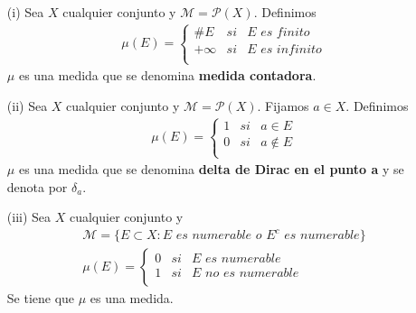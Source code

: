 \begin{ejemplo}
    \begin{enumerate}
        \item[(i)] Sea $X$ cualquier conjunto y $\mathcal{M} = \mathcal{P}(X)$. Definimos
              \begin{align*}
                  \mu(E) =  \left\{ \begin{array}{lcc}
                                        \#E     & si & \textit{E es finito}   \\
                                        +\infty & si & \textit{E es infinito} \\
                                    \end{array}
                  \right.
              \end{align*}
              $\mu$ es una medida que se denomina \textbf{medida contadora}.
        \item[(ii)] Sea $X$ cualquier conjunto y $\mathcal{M} = \mathcal{P}(X)$. Fijamos $a \in X$. Definimos
              \begin{align*}
                  \mu(E) =  \left\{ \begin{array}{lcc}
                                        1 & si & a \in E      \\
                                        0 & si & a \not \in E \\
                                    \end{array}
                  \right.
              \end{align*}
              $\mu$ es una medida que se denomina \textbf{delta de Dirac en el punto a} y se denota por $\delta_a$.
        \item[(iii)] Sea $X$ cualquier conjunto y
              \begin{align*}
                  \mathcal{M} =\{ E \subset X : E \textit{ es numerable o } E^c \textit{ es numerable} \} \\
                  \mu(E) =  \left\{ \begin{array}{lcc}
                                        0 & si & \textit{E es numerable}    \\
                                        1 & si & \textit{E no es numerable} \\
                                    \end{array}
                  \right.
              \end{align*}
              Se tiene que $\mu$ es una medida.

\end{enumerate}
\end{ejemplo}
